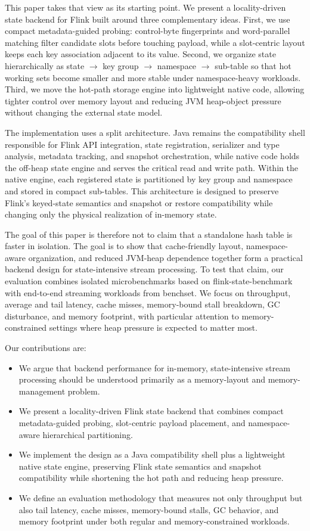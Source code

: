 \documentclass[sigconf]{acmart}
\begin{document}
This paper takes that view as its starting point. We present a locality-driven state backend for Flink built around three complementary ideas. First, we use compact metadata-guided probing: control-byte fingerprints and word-parallel matching filter candidate slots before touching payload, while a slot-centric layout keeps each key association adjacent to its value. Second, we organize state hierarchically as state $\rightarrow$ key group $\rightarrow$ namespace $\rightarrow$ sub-table so that hot working sets become smaller and more stable under namespace-heavy workloads. Third, we move the hot-path storage engine into lightweight native code, allowing tighter control over memory layout and reducing JVM heap-object pressure without changing the external state model.

The implementation uses a split architecture. Java remains the compatibility shell responsible for Flink API integration, state registration, serializer and type analysis, metadata tracking, and snapshot orchestration, while native code holds the off-heap state engine and serves the critical read and write path. Within the native engine, each registered state is partitioned by key group and namespace and stored in compact sub-tables. This architecture is designed to preserve Flink's keyed-state semantics and snapshot or restore compatibility while changing only the physical realization of in-memory state.

The goal of this paper is therefore not to claim that a standalone hash table is faster in isolation. The goal is to show that cache-friendly layout, namespace-aware organization, and reduced JVM-heap dependence together form a practical backend design for state-intensive stream processing. To test that claim, our evaluation combines isolated microbenchmarks based on flink-state-benchmark with end-to-end streaming workloads from benchset. We focus on throughput, average and tail latency, cache misses, memory-bound stall breakdown, GC disturbance, and memory footprint, with particular attention to memory-constrained settings where heap pressure is expected to matter most.

Our contributions are:
\begin{itemize}
\item We argue that backend performance for in-memory, state-intensive stream processing should be understood primarily as a memory-layout and memory-management problem.
\item We present a locality-driven Flink state backend that combines compact metadata-guided probing, slot-centric payload placement, and namespace-aware hierarchical partitioning.
\item We implement the design as a Java compatibility shell plus a lightweight native state engine, preserving Flink state semantics and snapshot compatibility while shortening the hot path and reducing heap pressure.
\item We define an evaluation methodology that measures not only throughput but also tail latency, cache misses, memory-bound stalls, GC behavior, and memory footprint under both regular and memory-constrained workloads.
\end{itemize}
\end{document}
